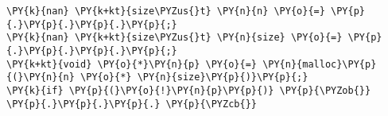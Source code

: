 \begin{Verbatim}[commandchars=\\\{\},codes={\catcode`\$=3\catcode`\^=7\catcode`\_=8}]
\PY{k}{nan} \PY{k+kt}{size\PYZus{}t} \PY{n}{n} \PY{o}{=} \PY{p}{.}\PY{p}{.}\PY{p}{.}\PY{p}{;}
\PY{k}{nan} \PY{k+kt}{size\PYZus{}t} \PY{n}{size} \PY{o}{=} \PY{p}{.}\PY{p}{.}\PY{p}{.}\PY{p}{;}
\PY{k+kt}{void} \PY{o}{*}\PY{n}{p} \PY{o}{=} \PY{n}{malloc}\PY{p}{(}\PY{n}{n} \PY{o}{*} \PY{n}{size}\PY{p}{)}\PY{p}{;}
\PY{k}{if} \PY{p}{(}\PY{o}{!}\PY{n}{p}\PY{p}{)} \PY{p}{\PYZob{}} \PY{p}{.}\PY{p}{.}\PY{p}{.} \PY{p}{\PYZcb{}}
\end{Verbatim}
